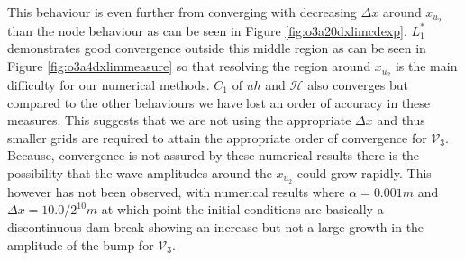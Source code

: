 \documentclass[SingleSpace,12pt,Journal]{Serre_ASCE}
\begin{document}
This behaviour is even further from converging with decreasing $\Delta x$ around $x_{u_2}$ than the node behaviour as can be seen in Figure \ref{fig:o3a20dxlimcdexp}. $L^*_1$ demonstrates good convergence outside this middle region as can be seen in Figure \ref{fig:o3a4dxlimmeasure} so that resolving the region around $x_{u_2}$ is the main difficulty for our numerical methods. $C_1$ of $uh$ and $\mathcal{H}$ also converges but compared to the other behaviours we have lost an order of accuracy in these measures. This suggests that we are not using the appropriate $\Delta x$ and thus smaller grids are required to attain the appropriate order of convergence for $\mathcal{V}_3$. Because, convergence is not assured by these numerical results there is the possibility that the wave amplitudes around the $x_{u_2}$ could grow rapidly. This however has not been observed, with numerical results where $\alpha = 0.001m$ and $\Delta x = 10.0/ 2^{10}m$ at which point the initial conditions are basically a discontinuous dam-break showing an increase but not a large growth in the amplitude of the bump for $\mathcal{V}_3$.
\end{document}
